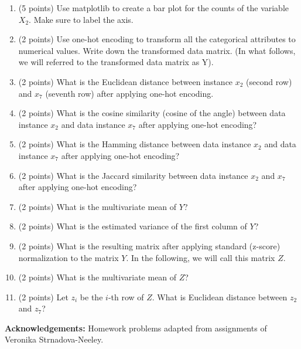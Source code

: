 \documentclass[11pt]{article}
\begin{document}
\begin{enumerate}
    \item (5 points) Use matplotlib to create a bar plot for the counts of the
    variable $X_2$.  Make sure to label the axis.

    \item (2 points) Use one-hot encoding to transform all the categorical
    attributes to numerical values.  Write down the transformed data matrix. (In
    what follows, we will referred to the transformed data matrix as Y).

    \item (2 points) What is the Euclidean distance between instance $x_2$
    (second row) and $x_7$ (seventh row) after applying one-hot encoding.

    \item (2 points) What is the cosine similarity (cosine of the angle)
    between data instance $x_2$ and data instance $x_7$ after applying one-hot
    encoding?

    \item (2 points) What is the Hamming distance between data instance $x_2$
    and data instance $x_7$ after applying one-hot encoding?

    \item (2 points) What is the Jaccard similarity between data instance $x_2$
    and $x_7$ after applying one-hot encoding?


    \item (2 points) What is the multivariate mean of $Y$?


    \item (2 points) What is the estimated variance of the first column of $Y$?

    \item (2 points) What is the resulting matrix after applying standard
    (z-score) normalization to the matrix $Y$.  In the following, we will call
    this matrix $Z$.

    \item (2 points) What is the multivariate mean of $Z$?

    \item (2 points) Let $z_i$ be the $i$-th row of $Z$.  What is Euclidean
    distance between $z_2$ and $z_7$?

\end{enumerate}

{\bf Acknowledgements:} Homework problems adapted from assignments of
Veronika Strnadova-Neeley.
\end{document}
